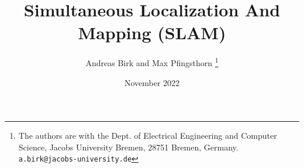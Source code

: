 \documentclass{article}
\title{Simultaneous Localization And Mapping (SLAM)}
\author{Andreas Birk and Max Pfingsthorn
\thanks{The authors are with the Dept. of Electrical Engineering and Computer Science, Jacobs University Bremen, 28751
Bremen, Germany. {\tt\small
a.birk@jacobs-university.de}}}
\date{November 2022}
\begin{document}
\maketitle
{\small


}
\end{document}
